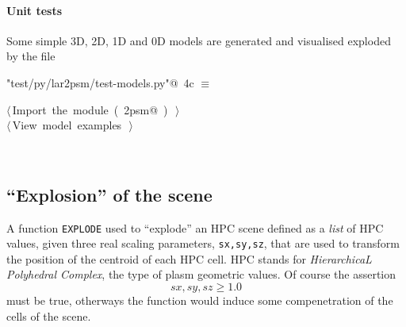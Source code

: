 \documentclass[11pt,oneside]{article}	%
\begin{document}
\paragraph{Unit tests}
Some simple 3D, 2D, 1D and 0D models are generated and visualised exploded by the file
\begin{flushleft} \small
\begin{minipage}{\linewidth} \label{scrap10}
\protect{}\verb@"test/py/lar2psm/test-models.py"@\nobreak\ {\footnotesize 4c }$\equiv$
\vspace{-1ex}
\begin{list}{}{} \item
\mbox{}\verb@@\hbox{$\langle\,$Import the module\nobreak\ ({\footnotesize {}\label{scrap11}
 }\mbox{}\verb@lar2psm@ ) {\footnotesize {}}$\,\rangle$}\verb@@\\
\mbox{}\verb@@\hbox{$\langle\,$View model examples\nobreak\ {\footnotesize {}}$\,\rangle$}\verb@@\\
\mbox{}\verb@@{\NWsep}
\end{list}
\vspace{-2ex}
\end{minipage}\\[4ex]
\end{flushleft}

\subsection{``Explosion'' of the scene}

A function \texttt{EXPLODE} used to ``explode'' an HPC scene defined as a \emph{list} of HPC values, given three real scaling parameters, \texttt{sx,sy,sz}, that are used to transform the position of the centroid of each HPC cell. HPC stands for \emph{HierarchicaL Polyhedral Complex}, the  type of plasm geometric values. Of course the assertion
\[
sx,sy,sz \geq 1.0
\]
must be true, otherways the function would induce some compenetration of the cells of the scene.
\end{document}
